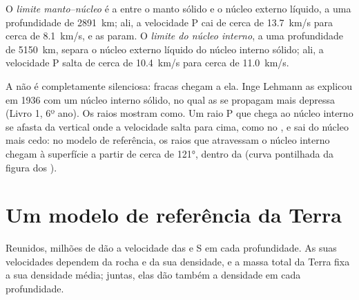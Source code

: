 \begin{definition}\label{def:g11:seismic-structure:core}
O \emph{limite manto--núcleo} é a  entre o manto sólido e o núcleo externo líquido, a uma profundidade
de \qty{2891}{km}; ali, a velocidade P cai de cerca de \qty{13.7}{km/s} para
cerca de \qty{8.1}{km/s}, e as  param. O \emph{limite do núcleo
interno}, a uma profundidade de \qty{5150}{km}, separa
o núcleo externo líquido do núcleo interno sólido; ali, a velocidade P salta
de cerca de \qty{10.4}{km/s} para cerca de \qty{11.0}{km/s}.
\end{definition}

A  não é completamente silenciosa:  fracas chegam a
ela. Inge Lehmann as explicou em 1936 com um núcleo interno sólido, no qual
as  se propagam mais depressa (Livro 1, 6º ano). Os raios mostram
como. Um raio P que chega ao núcleo interno se afasta da vertical onde a
velocidade salta para cima, como no , e sai do núcleo mais cedo: no
modelo de referência, os raios que atravessam o núcleo interno chegam à
superfície a partir de cerca de \ang{121}, dentro da  (curva
pontilhada da figura dos ).

\section{Um modelo de referência da Terra}\label{sec:g11:seismic-structure:model}

Reunidos, milhões de  dão a velocidade das  e S em
cada profundidade. As suas velocidades dependem da rocha e da sua
densidade, e a massa total da Terra fixa a sua densidade média; juntas, elas
dão também a densidade em cada profundidade.

